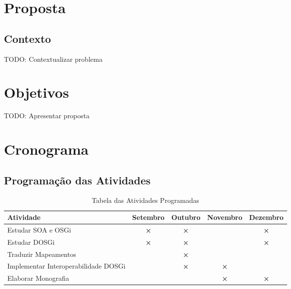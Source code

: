 \chapter{Proposta}
\section{Contexto}
\label{pr:contex}
TODO: Contextualizar problema

\newpage
\chapter{Objetivos}
\label{pr:objectives}
TODO: Apresentar proposta

\newpage
\chapter{Cronograma}
\label{pr:chrono}

\section{Programaç\~ao das Atividades}
{%
\begin{center}
\begin{table*}[h]
\begin{supertabular}[]{|l|c|c|c|c|}\hline
\textbf{Atividade} & \textbf{Setembro} & \textbf{Outubro} & \textbf{Novembro} & \textbf{Dezembro}\\\hline
Estudar SOA e OSGi & \textbf{×} & \textbf{×} &   & \textbf{×}\\\hline
Estudar DOSGi & \textbf{×} & \textbf{×} &  & \textbf{×}\\\hline
Traduzir Mapeamentos &   & \textbf{×} &   &  \\\hline
Implementar Interoperabilidade DOSGi &   & \textbf{×} & \textbf{×} &  \\\hline
Elaborar Monografia &   &   & \textbf{×} & \textbf{×}\\\hline
\end{supertabular}
\caption{Tabela das Atividades Programadas}
\end{table*}
\end{center}
}%

